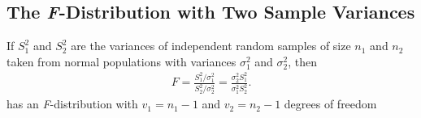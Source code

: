 \documentclass[10pt]{article}
\begin{document}
\subsection{The \textit{F}-Distribution with Two Sample Variances}
\begin{theorem}
    If $S_1^2$ and $S_2^2$ are the variances of independent random samples of size $n_1$ and $n_2$ taken from normal populations with variances $\sigma_1^2$ and $\sigma_2^2$, then
        \begin{gather*}
            F = \frac{S_1^2 / \sigma_1^2}{S_2^2 / \sigma_2^2} = \frac{\sigma_2^2 S_1^2}{\sigma_1^2 S_2^2}
        .\end{gather*}
        has an \textit{F}-distribution with $v_1 = n_1 - 1$ and $v_2 = n_2 - 1$ degrees of freedom
\end{theorem}
\end{document}
